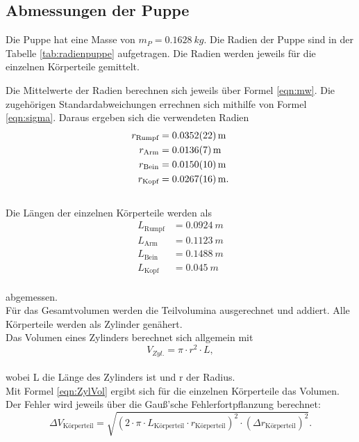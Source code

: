 \subsection{Abmessungen der Puppe}
Die Puppe hat eine Masse von $m_{P}=\SI{0.1628}{kg}$.
Die Radien der Puppe sind in der Tabelle \ref{tab:radienpuppe} aufgetragen.
Die Radien werden jeweils für die einzelnen Körperteile gemittelt.

Die Mittelwerte der Radien berechnen sich jeweils über Formel \eqref{eqn:mw}.
Die zugehörigen Standardabweichungen errechnen sich mithilfe von Formel \eqref{eqn:sigma}.
Daraus ergeben sich die verwendeten Radien
\begin{align*}
r_{\text{Rumpf}} &= \SI{0.0352 \pm 0.0022}{m} \\
r_{\text{Arm}} &= \SI{0.0136 \pm 0.0007}{m}  \\
r_{\text{Bein}} &= \SI{0.0150 \pm 0.0010}{m} \\
r_{\text{Kopf}} &= \SI{0.0267 \pm 0.0016}{m}.\\
\end{align*}
\\Die Längen der einzelnen Körperteile werden als
\begin{align*}
L_{\text{Rumpf}} &= \SI{0.0924}{m}   \\
L_{\text{Arm}} &= \SI{0.1123}{m}     \\
L_{\text{Bein}} &= \SI{0.1488}{m}    \\
L_{\text{Kopf}} &= \SI{0.045}{m}
\end{align*}
\\abgemessen.
\\Für das Gesamtvolumen werden die Teilvolumina ausgerechnet und addiert.
Alle Körperteile werden als Zylinder genähert.
\\Das Volumen eines Zylinders berechnet sich allgemein mit
\begin{equation}
  V_{Zyl.}= \pi \cdot r^2 \cdot L,
\label{eqn:ZylVol}
\end{equation}
\\wobei L die Länge des Zylinders ist und r der Radius.
\\Mit Formel \eqref{eqn:ZylVol} ergibt sich für die einzelnen Körperteile das Volumen.
Der Fehler wird jeweils über die Gauß'sche Fehlerfortpflanzung berechnet:
\begin{equation}
  \Delta V_{\text{Körperteil}} = \sqrt{ (2 \cdot \pi \cdot L_{\text{Körperteil}} \cdot r_{\text{Körperteil}})^2 \cdot (\Delta r_{\text{Körperteil}})^2 }.
\label{eqn:gaussvol}
\end{equation}
